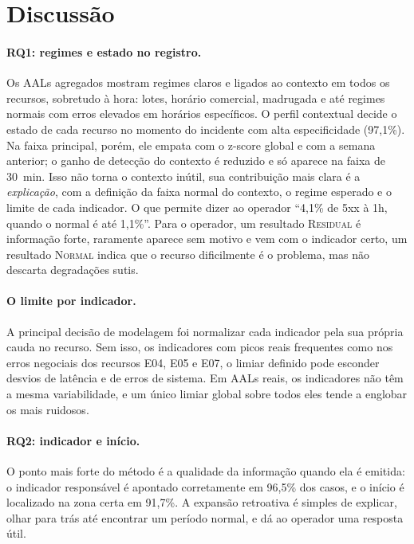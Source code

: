 \documentclass[sigconf,nonacm]{acmart}
\newcommand{\Normal}{\textsc{Normal}\xspace}
\newcommand{\Residual}{\textsc{Residual}\xspace}
\begin{document}
\section{Discussão}\label{sec:discussao}

\paragraph{RQ1: regimes e estado no registro.} Os AALs agregados mostram regimes claros e ligados ao contexto em todos os recursos, sobretudo à hora: lotes, horário comercial, madrugada e até regimes normais com erros elevados em horários específicos. O perfil contextual decide o estado de cada recurso no momento do incidente com alta especificidade (97,1\%). Na faixa principal, porém, ele empata com o z-score global e com a semana anterior; o ganho de detecção do contexto é reduzido e só aparece na faixa de 30~min. Isso não torna o contexto inútil, sua contribuição mais clara é a \emph{explicação}, com a definição da faixa normal do contexto, o regime esperado e o limite de cada indicador. O que permite dizer ao operador ``4,1\% de 5xx à 1h, quando o normal é até 1,1\%''. Para o operador, um resultado \Residual é informação forte, raramente aparece sem motivo e vem com o indicador certo, um resultado \Normal indica que o recurso dificilmente é o problema, mas não descarta degradações sutis.

\paragraph{O limite por indicador.} A principal decisão de modelagem foi normalizar cada indicador pela sua própria cauda no recurso. Sem isso, os indicadores com picos reais frequentes como nos erros negociais dos recursos E04, E05 e E07, o limiar definido pode esconder desvios de latência e de erros de sistema. Em AALs reais, os indicadores não têm a mesma variabilidade, e um único limiar global sobre todos eles tende a englobar os mais ruidosos.

\paragraph{RQ2: indicador e início.} O ponto mais forte do método é a qualidade da informação quando ela é emitida: o indicador responsável é apontado corretamente em 96,5\% dos casos, e o início é localizado na zona certa em 91,7\%. A expansão retroativa é simples de explicar, olhar para trás até encontrar um período normal, e dá ao operador uma resposta útil. 
\end{document}
